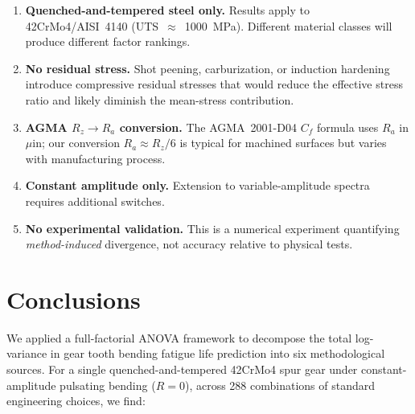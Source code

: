\documentclass[12pt,a4paper]{article}
\begin{document}
\begin{enumerate}
  \item \textbf{Quenched-and-tempered steel only.} Results apply to
        42CrMo4/AISI~4140 (UTS~$\approx$~1000~MPa). Different material
        classes will produce different factor rankings.
  \item \textbf{No residual stress.} Shot peening, carburization, or
        induction hardening introduce compressive residual stresses that
        would reduce the effective stress ratio and likely diminish the
        mean-stress contribution.
  \item \textbf{AGMA $R_z \rightarrow R_a$ conversion.} The AGMA~2001-D04
        $C_f$ formula uses $R_a$ in $\mu$in; our conversion $R_a \approx
        R_z/6$ is typical for machined surfaces but varies with
        manufacturing process.
  \item \textbf{Constant amplitude only.} Extension to variable-amplitude
        spectra requires additional switches.
  \item \textbf{No experimental validation.} This is a numerical
        experiment quantifying \emph{method-induced} divergence, not
        accuracy relative to physical tests.
\end{enumerate}

\section{Conclusions}
\label{sec:conclusions}

We applied a full-factorial ANOVA framework to decompose the total
log-variance in gear tooth bending fatigue life prediction into six
methodological sources. For a single quenched-and-tempered 42CrMo4 spur
gear under constant-amplitude pulsating bending ($R=0$), across 288
combinations of standard engineering choices, we find:
\end{document}
